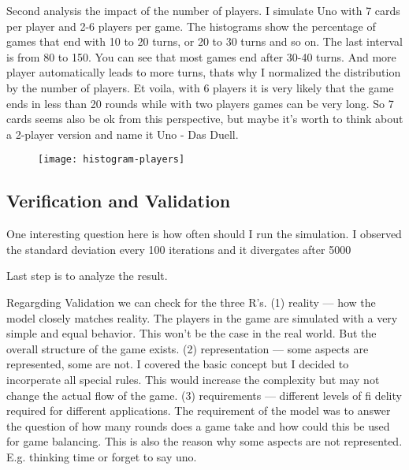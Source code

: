 Second analysis the impact of the number of players. I simulate Uno with 7 cards per player and 2-6 players per game. The histograms show the percentage of games that end with 10 to 20 turns, or 20 to 30 turns and so on. The last interval is from 80 to 150. You can see that most games end after 30-40 turns. And more player automatically leads to more turns, thats why I normalized the distribution by the number of players. Et voila, with 6 players it is very likely that the game ends in less than 20 rounds while with two players games can be very long. So 7 cards seems also be ok from this perspective, but maybe it’s worth to think about a 2-player version and name it Uno - Das Duell.


\begin{figure}[h!]
  \caption{}
  \texttt{[image: histogram-players]}
\end{figure}

\subsection{Verification and Validation}


One interesting question here is how often should I run the simulation. I observed the standard deviation every 100 iterations and it divergates after 5000

Last step is to analyze the result. 

Regargding Validation we can check for the three R’s.
(1) reality — how the model closely matches reality. The players in the game are simulated with a very simple and equal behavior. This won’t be the case in the real world. But the overall structure of the game exists.
(2) representation — some aspects are represented, some are not. I covered the basic concept but I decided to incorperate all special rules. This would increase the complexity but may not change the actual flow of the game.
(3) requirements — different levels of fi delity required for different applications. The requirement of the model was to answer the question of how many rounds does a game take and how could this be used for game balancing. This is also the reason why some aspects are not represented. E.g. thinking time or forget to say uno.

